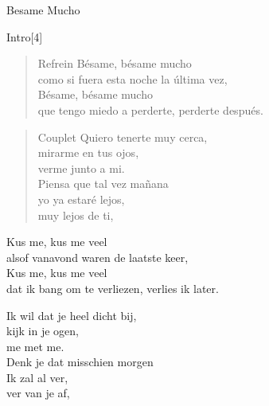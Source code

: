 \begin{song}[bolero]{Besame Mucho}
\begin{instrumental}{Intro}[4]
\end{instrumental}

\begin{verse}{Refrein}
Bésame, bésame mucho\\
como si fuera esta noche la última vez,\\	
Bésame, bésame mucho\\
que tengo miedo a perderte, perderte después.
\end{verse}
\begin{verse}{Couplet}
Quiero tenerte muy cerca,\\
mirarme en tus ojos, \\
verme junto a mi.\\
Piensa que tal vez mañana \\
yo ya estaré lejos,\\
muy lejos de ti,
\end{verse}

\end{song}

\clearpage
\begin{translation}
Kus me, kus me veel\\
alsof vanavond waren de laatste keer,\\
Kus me, kus me veel\\
dat ik bang om te verliezen, verlies ik later.\vspace{\wlskip}

Ik wil dat je heel dicht bij,\\
kijk in je ogen,\\
me met me.\\
Denk je dat misschien morgen\\
Ik zal al ver,\\
ver van je af,\\
\end{translation}
